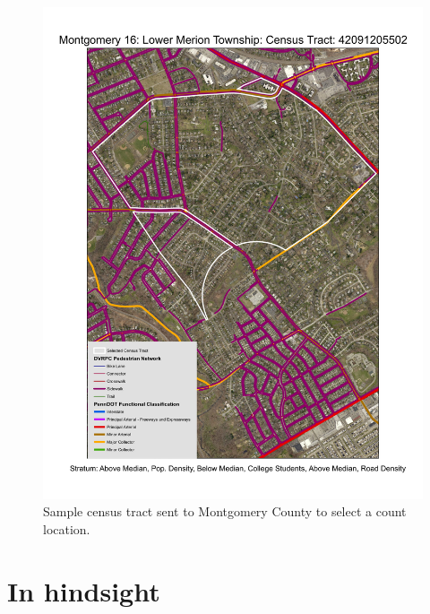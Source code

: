 \documentclass[paper=letterpaper, fontsize=11pt]{scrartcl}
\begin{document}
\FloatBarrier
\begin{figure}[!htbp]
	\centering
	\includegraphics[width=\textwidth]{county-corresp-4.jpg}
	\caption{Sample census tract sent to Montgomery County to select a count location.}
	\label{corresp-4}
\end{figure}
\FloatBarrier

\section{In hindsight}
\label{sec:improvements}
\end{document}

